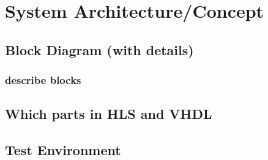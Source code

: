 \chapter{System Architecture/Concept}
\label{cha:SystemArchitecture/Concept}

  \section{Block Diagram (with details)}
    \subsection{describe blocks}

  \section{Which parts in HLS and VHDL}

  \section{Test Environment}
